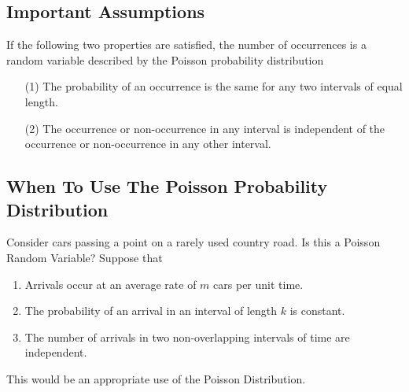 \documentclass[a4paper,12pt]{article}
\begin{document}
\subsection*{Important Assumptions}
 If the following two properties are satisfied, the number of occurrences is a random variable described by the Poisson probability distribution
%
\begin{itemize}
\item[(1)]      The probability of an occurrence is the same for any two intervals of equal length.
\item[(2)]     The occurrence or non-occurrence in any interval is independent of the occurrence or non-occurrence in any other interval.
\end{itemize}












\subsection*{When To Use The Poisson Probability Distribution}
Consider cars passing a point on a rarely used country road. Is this a Poisson Random Variable?
Suppose that 
\begin{enumerate}
\item Arrivals occur at an average rate of $m$ cars per unit time.
\item The probability of an arrival in an interval of length $k$
is constant.
\item The number of arrivals in two non-overlapping
intervals of time are independent.
\end{enumerate}
This would be an appropriate use of the Poisson Distribution.

\end{document}
